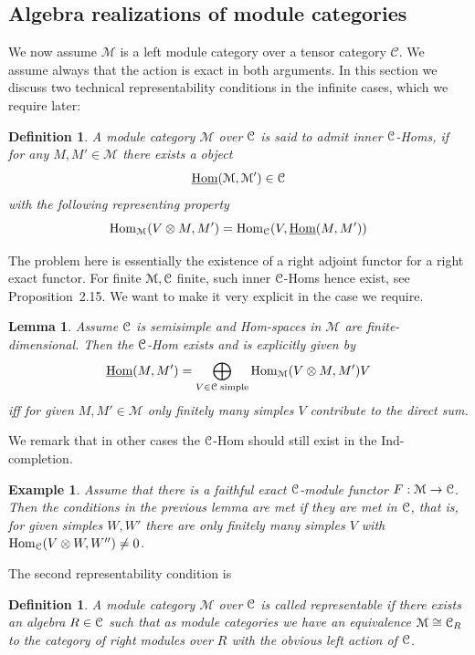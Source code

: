 \documentclass[a4paper, reqno]{amsart}
\newtheorem{definition}[theorem]{Definition}
\newtheorem{example}[theorem]{Example}
\newtheorem{lemma}[theorem]{Lemma}
\theoremstyle{introTheorems}
\newcommand\cC{\mathcal{C}}
\newcommand\Hom{\textup{Hom}}
\renewcommand{\1}{\mathbbold{1}}
\begin{document}
\newcommand{\catM}{\mathcal{M}}


\subsection{Algebra realizations of module categories}\label{subsec:BorelModulecat}

We now assume $\catM$ is a left module category over a tensor category $\cC$. We assume always that the action is exact in both arguments. In this section we discuss two technical representability conditions in the infinite cases, which we require later:

\begin{definition}
A module category $\catM$ over $\mathcal{C}$ is said to admit inner $\mathcal{C}$-Homs, if for any $M,M'\in \catM$ there exists a  object
$$\underline{\Hom}(\catM,\catM')\in \catC$$ 
with the following representing property
$$\Hom_\catM(V\otimes M,M')
=\Hom_\catC(V,\underline{\Hom}(M,M'))$$
\end{definition}

The problem here is essentially the existence of a right adjoint functor for a right exact functor. For finite $\catM,\catC$ finite, such inner $\mathcal{C}$-Homs hence exist, see  \cite{DSPS19} Proposition~2.15.
%
 We want to make it very explicit in the case we require.
\begin{lemma}\label{lemma_finite}
Assume $\mathcal{C}$ is semisimple and Hom-spaces in $\catM$ are finite-dimensional. Then the $\mathcal{C}$-Hom exists and is explicitly given by 
$$\underline{\Hom}(M,M')
=\bigoplus_{V\in\catC\;\text{simple}}
\Hom_\catM(V\otimes M,M')V
$$
iff for given $M,M'\in\catM$ only  finitely many simples $V$ contribute to the direct sum. 
\end{lemma}
We remark that in other cases the $\mathcal{C}$-Hom should still exist in the Ind-completion.

\begin{example}\label{exm_semisimplefinite}
Assume that there is a faithful exact $\mathcal{C}$-module functor $F:\catM\to \catC$. Then the conditions in the previous lemma are met if they are met in $\mathcal{C}$, that is, for given simples $W,W'$ there are only finitely many simples $V$ with $\Hom_\catC(V\otimes W,W'')\neq 0$.
\end{example}

The second representability condition is 



\begin{definition}
A module category $\catM$ over $\mathcal{C}$ is called \emph{representable} if there exists an algebra $R\in \mathcal{C}$ such that as module categories we have an equivalence $\catM\cong \catC_R$ to the category of right modules over $R$ with the obvious left action of $\mathcal{C}$.
\end{definition}
\end{document}
